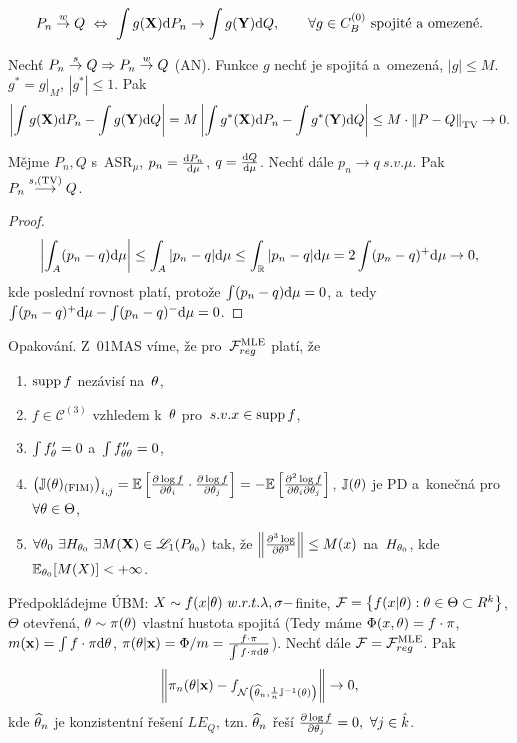 \begin{remark}
	$$ P_n\stackrel{w}{\to} Q~\Leftrightarrow~\int g(\textbf{X})\mathrm{d} P_n\to\int g(\textbf{Y})\mathrm{d} Q,\qquad \forall g\in C_B^{(0)}\text{ spojité a~omezené.}$$
\end{remark}
\begin{theorem}
	Nechť $P_n\stackrel{s}{\to}Q\Rightarrow P_n\stackrel{w}{\to} Q$ (AN). Funkce $g$ nechť je spojitá a~omezená, $|g|\leq M$. $g^\ast =g|_M$, $|g^\ast|\leq 1$. Pak
	$$ \left| \int g(\textbf{X})\mathrm{d} P_n-\int g(\textbf{Y})\mathrm{d} Q \right|=M\left| \int g^\ast(\textbf{X})\mathrm{d} P_n-\int g^\ast(\textbf{Y})\mathrm{d} Q \right|\leq M\cdot \left\| P-Q\right\|_{\mathrm{TV}}\to0.$$
\end{theorem}
\begin{theorem}
	Mějme $P_n,Q$ s~ASR$_\mu$, $p_n=\frac{\mathrm{d} P_n}{\mathrm{d} \mu}$, $q=\frac{\mathrm{d} Q}{\mathrm{d} \mu}$. Nechť dále $p_n\to q~s.v.\mu$. Pak $P_n\stackrel{s,(\mathrm{TV})}{\longrightarrow}Q$. 
	\begin{proof}
		$$ \left| \int_A (p_n-q)\mathrm{d}\mu \right|\leq \int_A|p_n-q|\mathrm{d}\mu\leq \int_{\mathbb{R}}|p_n-q|\mathrm{d}\mu=2\int(p_n-q)^+\mathrm{d}\mu\to0,$$
	kde poslední rovnost platí, protože $\int(p_n-q)\mathrm{d}\mu=0$, a~tedy $\int(p_n-q)^+\mathrm{d}\mu-\int(p_n-q)^-\mathrm{d}\mu=0$.	\end{proof}
\end{theorem}
\begin{remark}
	Opakování. Z~01MAS víme, že pro~$\mathcal{F}_{reg}^{\mathrm{{\footnotesize MLE }}}$ platí, že \begin{enumerate}[1)]
		\item $\mathop{\mathrm{supp}} f$ nezávisí na~$\theta$,
		\item $f\in\mathcal{C}^{(3)}$ vzhledem k~$\theta$ pro~$s.v.x\in\mathop{\mathrm{supp}} f$,
		\item $\int f_\theta'=0$ a~$\int f_{\theta\theta}''=0$,
		\item $\left( \mathbb{J}(\theta)_{(\text{FIM})} \right)_{i,j}=\mathbb{E}\left[ \frac{\partial\log f}{\partial \theta_i}\cdot\frac{\partial\log f}{\partial \theta_j} \right]=-\mathbb{E}\left[ \frac{\partial^2 \log f}{\partial\theta_i \partial \theta_j} \right]$, $\mathbb{J}(\theta)$ je PD a~konečná pro~$\forall\theta\in\Theta$,
		\item $\forall\theta_0~\exists H_{\theta_0}~\exists M(\textbf{X})\in\mathscr{L}_1(P_{\theta_0})$ tak, že $\left\| \frac{\partial^3\log }{\partial \theta^3}\right\|\leq M(x)$ na~$H_{\theta_0}$, kde $\mathbb{E}_{\theta_0}[M(X)]<+\infty$.
	\end{enumerate}
\end{remark}
\begin{theorem}
	Předpokládejme ÚBM: $X\sim f(x|\theta)~w.r.t.\lambda,\sigma-$finite, $\mathcal{F}=\left\{ f(x|\theta):\theta\in\Theta\subset R^k \right\}$, $\Theta$ otevřená, $\theta\sim\pi(\theta)$ vlastní hustota spojitá (Tedy máme $\Phi(x,\theta)=f\cdot\pi$, $m(\textbf{x})=\int f\cdot \pi\mathrm{d}\theta$, $\pi(\theta|\textbf{x})=\Phi/m=\frac{f\cdot\pi}{\int f\cdot\pi\mathrm{d}\theta}$). Nechť dále $\mathcal{F}=\mathcal{F}_{reg}^{\mathrm{{\footnotesize MLE }}}$. Pak
	$$ \left\| \pi_n(\theta|\textbf{x})-f_{\mathcal{N}\left( \widehat{\theta}_n,\frac{1}{n}\mathbb{J}^{-1}(\theta) \right)} \right\|\to0,$$
	kde $\widehat{\theta}_n$ je konzistentní řešení $LE_Q$, tzn. $\widehat{\theta}_n$ řeší $\frac{\partial \log f}{\partial \theta_j}=0,~\forall j\in\hat{k}$.
\end{theorem}
